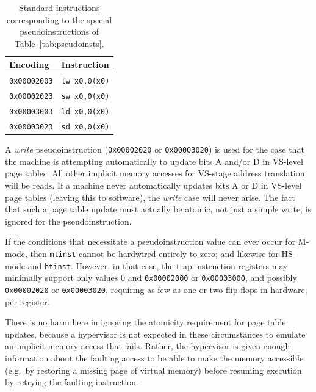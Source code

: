 \begin{table}[h!]
\begin{center}
\begin{tabular}{|l|l|}
\hline
Encoding         & Instruction \\ \hline
{\tt 0x00002003} & {\tt lw x0,0(x0)} \\
{\tt 0x00002023} & {\tt sw x0,0(x0)} \\ \hline
{\tt 0x00003003} & {\tt ld x0,0(x0)} \\
{\tt 0x00003023} & {\tt sd x0,0(x0)} \\ \hline
\end{tabular}
\end{center}
\caption{Standard instructions corresponding to the special
pseudoinstructions of Table~\ref{tab:pseudoinsts}.}
\label{tab:pseudoinsts-basis}
\end{table}

A \textit{write} pseudoinstruction ({\tt 0x00002020} or {\tt 0x00003020})
is used for the case that the machine is attempting automatically to
update bits A and/or D in VS-level page tables.
All other implicit memory accesses for VS-stage address translation will
be reads.
If a machine never automatically updates bits A or D in VS-level page
tables (leaving this to software), the \textit{write} case will never
arise.
The fact that such a page table update must actually be atomic, not just
a simple write, is ignored for the pseudoinstruction.

\begin{commentary}
If the conditions that necessitate a pseudoinstruction value can ever
occur for M-mode, then {\tt mtinst} cannot be hardwired entirely to zero;
and likewise for HS-mode and {\tt htinst}.
However, in that case, the trap instruction registers may minimally
support only values 0 and {\tt 0x00002000} or {\tt 0x00003000}, and
possibly {\tt 0x00002020} or {\tt 0x00003020}, requiring as few as one or
two flip-flops in hardware, per register.
\end{commentary}

\begin{commentary}
There is no harm here in ignoring the atomicity requirement for page
table updates, because a hypervisor is not expected in these
circumstances to emulate an implicit memory access that fails.
Rather, the hypervisor is given enough information about the faulting
access to be able to make the memory accessible (e.g.\ by restoring a
missing page of virtual memory) before resuming execution by retrying the
faulting instruction.
\end{commentary}


